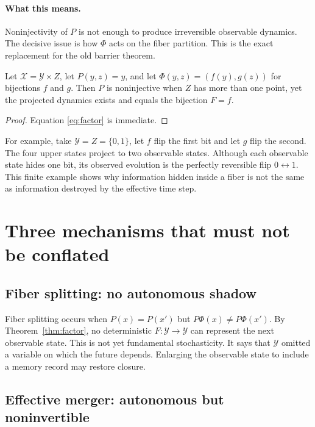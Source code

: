 \documentclass[11pt]{article}
\newcommand{\X}{\mathcal X}
\newcommand{\Y}{\mathcal Y}
\begin{document}
\paragraph{What this means.}
Noninjectivity of $P$ is not enough to produce irreversible observable
dynamics. The decisive issue is how $\Phi$ acts on the fiber partition. This
is the exact replacement for the old barrier theorem.

\begin{corollary}
\label{cor:counter}
Let $\X=\Y\times Z$, let $P(y,z)=y$, and let
$\Phi(y,z)=(f(y),g(z))$ for bijections $f$ and $g$. Then $P$ is noninjective
when $Z$ has more than one point, yet the projected dynamics exists and equals
the bijection $F=f$.
\end{corollary}

\begin{proof}
Equation \eqref{eq:factor} is immediate.
\end{proof}

For example, take $\Y=Z=\{0,1\}$, let $f$ flip the first bit and let $g$ flip
the second. The four upper states project to two observable states. Although
each observable state hides one bit, its observed evolution is the perfectly
reversible flip $0\leftrightarrow1$. This finite example shows why information
hidden inside a fiber is not the same as information destroyed by the
effective time step.

\section{Three mechanisms that must not be conflated}

\subsection{Fiber splitting: no autonomous shadow}

Fiber splitting occurs when $P(x)=P(x')$ but
$P\Phi(x)\neq P\Phi(x')$. By Theorem~\ref{thm:factor}, no deterministic
$F:\Y\to\Y$ can represent the next observable state. This is not yet
fundamental stochasticity. It says that $\Y$ omitted a variable on which the
future depends. Enlarging the observable state to include a memory record may
restore closure.

\subsection{Effective merger: autonomous but noninvertible}
\end{document}
